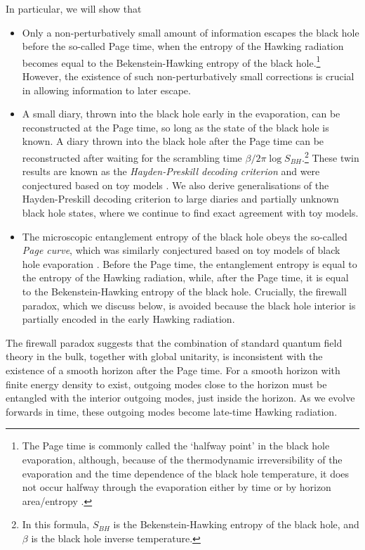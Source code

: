 \documentclass[12pt]{article}
\begin{document}
In particular, we will show that
\begin{itemize}
\item Only a non-perturbatively small amount of information escapes the black hole before the so-called Page time, when the entropy of the Hawking radiation becomes equal to the Bekenstein-Hawking entropy of the black hole.\footnote{The Page time is commonly called the `halfway point' in the black hole evaporation, although, because of the thermodynamic irreversibility of the evaporation and the time dependence of the black hole temperature, it does not occur halfway through the evaporation either by time or by horizon area/entropy \cite{page2013time}.} However, the existence of such non-perturbatively small corrections is crucial in allowing information to later escape.

\item A small diary, thrown into the black hole early in the evaporation, can be reconstructed at the Page time, so long as the state of the black hole is known. A diary thrown into the black hole after the Page time can be reconstructed after waiting for the scrambling time $\beta/2\pi \log S_{BH}$.\footnote{In this formula, $S_{BH}$ is the Bekenstein-Hawking entropy of the black hole, and $\beta$ is the black hole inverse temperature.} These twin results are known as the \emph{Hayden-Preskill decoding criterion} and were conjectured based on toy models \cite{hayden2007black}. We also derive generalisations of the Hayden-Preskill decoding criterion to large diaries and partially unknown black hole states, where we continue to find exact agreement with toy models.

\item The microscopic entanglement entropy of the black hole obeys the so-called \emph{Page curve}, which was similarly conjectured based on toy models of black hole evaporation \cite{page1993information}. Before the Page time, the entanglement entropy is equal to the entropy of the Hawking radiation, while, after the Page time, it is equal to the Bekenstein-Hawking entropy of the black hole. Crucially, the firewall paradox, which we discuss below, is avoided because the black hole interior is partially encoded in the early Hawking radiation.
\end{itemize}
The firewall paradox \cite{almheiri2013black} suggests that the combination of standard quantum field theory in the bulk, together with global unitarity, is inconsistent with the existence of a smooth horizon after the Page time. For a smooth horizon with finite energy density to exist, outgoing modes close to the horizon must be entangled with the interior outgoing modes, just inside the horizon. As we evolve forwards in time, these outgoing modes become late-time Hawking radiation. 
\end{document}
